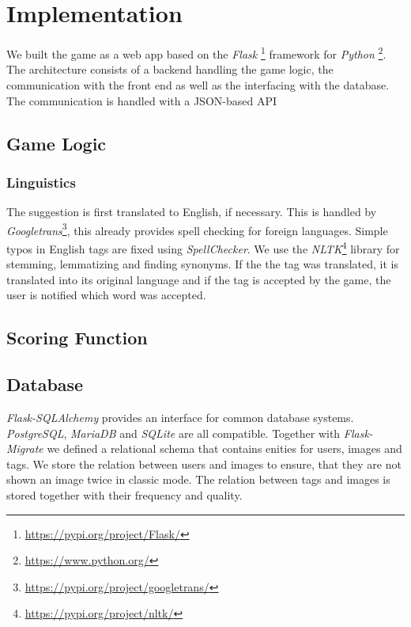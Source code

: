 \section{Implementation}
\label{gXLII:sec:implementation}  %


We built the game as a web app based on the \textit{Flask} \footnote{\url{https://pypi.org/project/Flask/}} framework for \textit{Python} \footnote{\url{https://www.python.org/}}. The architecture consists of a backend handling the game logic, the communication with the front end as well as the interfacing with the database. The communication is handled with a JSON-based API

\subsection{Game Logic}
\label{gXLII:sec:implementation:game}  %



\subsubsection{Linguistics}
\label{gXLII:sec:implementation:linguistics}  %
The suggestion is first translated to English, if necessary. This is handled by \textit{Googletrans}\footnote{\url{https://pypi.org/project/googletrans/}}, this already provides spell checking for foreign languages.
Simple typos in English tags are fixed using \textit{SpellChecker}. We use the \textit{NLTK}\footnote{\url{https://pypi.org/project/nltk/}} library for stemming, lemmatizing and finding synonyms. If the the tag was translated, it is translated into its original language and if the tag is accepted by the game, the user is notified which word was accepted.

\subsection{Scoring Function}

\subsection{Database}
\label{gXLII:sec:implementation:database}  %
\textit{Flask-SQLAlchemy} provides an interface for common database systems. \textit{PostgreSQL}, \textit{MariaDB} and \textit{SQLite} are all compatible.
Together with \textit{Flask-Migrate} we defined a relational schema that contains enities for users, images and tags. We store the relation between users and images to ensure, that they are not shown an image twice in classic mode. The relation between tags and images is stored together with their frequency and quality.

